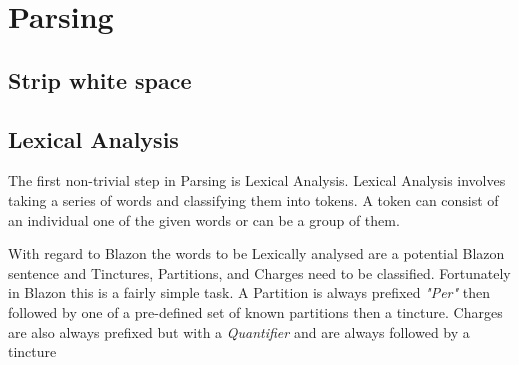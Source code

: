 \chapter{Parsing}



\section{Strip white space}

\section{Lexical Analysis} 

The first non-trivial step in Parsing is Lexical Analysis.  Lexical Analysis involves taking a series of words and classifying them into tokens.  A token can consist of an individual one of the given words or can be a group of them.  

With regard to Blazon the words to be Lexically analysed are a potential Blazon sentence and Tinctures, Partitions, and Charges need to be classified.  Fortunately in Blazon this is a fairly simple task.  A Partition is always prefixed \emph{"Per"} then followed by one of a pre-defined set of known partitions then a tincture.  Charges are also always prefixed but with a \emph{Quantifier} and are always followed by a tincture 
